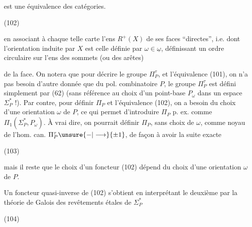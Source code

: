 est une équivalence des catégories.  

(102)

en associant à chaque telle carte l'ens $R^+(X)$ de ses  faces ``directes'', i.e.  dont l'orientation induite par $X$ est celle définie par $\omega\in\underline\omega$, définissant un ordre circulaire sur l'ens des sommets (ou des arêtes)

de la face. On notera que pour décrire le groupe $\Pi_P^\tau$, et l'équivalence (101), on n'a pas besoin d'autre donnée que du pol. combinatoire $P$, le groupe $\Pi_P^\tau$ est défini simplement par (62) (sans référence au choix d'un point-base $P_\omega$ dans un espace $\Sigma_P^*$ !). Par contre, pour définir $\Pi_P$ et l'équivalence (102), on a besoin du choix d'une orientation $\omega$ de $P$, ce qui permet d'introduire $\Pi_P$ p. ex. comme $\Pi_1(\Sigma_P^*,P_\omega)$. À vrai dire, on pourrait définir $\Pi_P$, sans choix de $\omega$, comme noyau de l'hom. can. $\Pi_P^\tau\unsure{\mathbin{-}|\longrightarrow}\{\pm1\}$, de façon à avoir la suite exacte

(103)

mais il reste que le choix d'un foncteur (102) dépend du choix d'une orientation $\omega$ de $P$.

Un foncteur quasi-inverse de (102) s'obtient en interprétant le deuxième  par la théorie de Galois des revêtements étales de $\Sigma_P^*$

(104)


